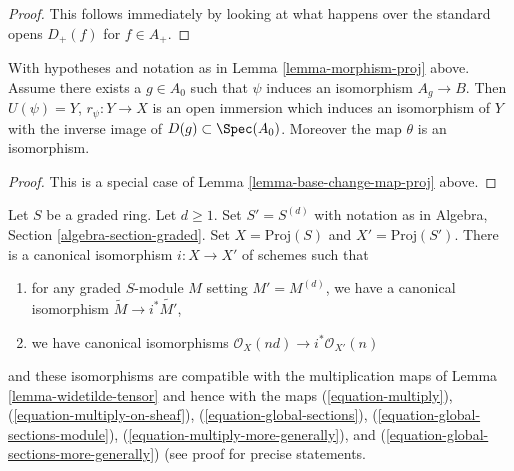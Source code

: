 \begin{proof}
This follows immediately by looking at what happens over the standard
opens $D_{+}(f)$ for $f \in A_{+}$.
\end{proof}

\begin{lemma}
\label{lemma-localization-map-proj}
With hypotheses and notation as in Lemma \ref{lemma-morphism-proj} above.
Assume there exists a $g \in A_0$ such that $\psi$ induces an
isomorphism $A_g \to B$. Then
$U(\psi) = Y$, $r_\psi : Y \to X$ is an open immersion
which induces an isomorphism of $Y$ with the inverse image
of $D(g) \subset \Spec(A_0)$. Moreover the map $\theta$
is an isomorphism.
\end{lemma}

\begin{proof}
This is a special case of Lemma \ref{lemma-base-change-map-proj} above.
\end{proof}

\begin{lemma}
\label{lemma-d-uple}
Let $S$ be a graded ring. Let $d \geq 1$. Set $S' = S^{(d)}$ with notation
as in Algebra, Section \ref{algebra-section-graded}. Set
$X = \text{Proj}(S)$ and $X' = \text{Proj}(S')$. There is a canonical
isomorphism $i : X \to X'$ of schemes such that
\begin{enumerate}
\item for any graded $S$-module $M$ setting $M' = M^{(d)}$,
we have a canonical isomorphism $\widetilde{M} \to i^*\widetilde{M'}$,
\item we have canonical isomorphisms
$\mathcal{O}_{X}(nd) \to i^*\mathcal{O}_{X'}(n)$
\end{enumerate}
and these isomorphisms are compatible with the multiplication maps
of Lemma \ref{lemma-widetilde-tensor} and hence with the maps
(\ref{equation-multiply}),
(\ref{equation-multiply-on-sheaf}),
(\ref{equation-global-sections}),
(\ref{equation-global-sections-module}),
(\ref{equation-multiply-more-generally}), and
(\ref{equation-global-sections-more-generally}) (see proof for precise
statements.
\end{lemma}

